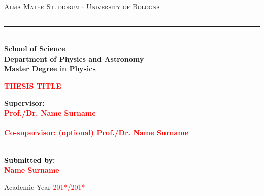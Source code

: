 \documentclass[12pt,a4paper]{report}
\begin{document}
\begin{titlepage}
%
%
%
%
\begin{center}
{{\Large{\textsc{Alma Mater Studiorum $\cdot$ University of  Bologna}}}} 
\rule[0.1cm]{15.8cm}{0.1mm}
\rule[0.5cm]{15.8cm}{0.6mm}
\\\vspace{3mm}
{\small{\bf School of Science \\
Department of Physics and Astronomy\\
Master Degree in Physics}}
\end{center}

\vspace{23mm}

\begin{center}\textcolor{red}{
%
%
{\LARGE{\bf THESIS TITLE}}\\
}\end{center}

\vspace{50mm} \par \noindent

\begin{minipage}[t]{0.47\textwidth}
%
%
{\large{\bf Supervisor: \vspace{2mm}\\\textcolor{red}{
Prof./Dr. Name Surname}\\\\
%
%
%
\textcolor{red}{
\bf Co-supervisor: (optional)
\vspace{2mm}
Prof./Dr. Name Surname\\\\}}}
\end{minipage}
%
\hfill
%
\begin{minipage}[t]{0.47\textwidth}\raggedleft \textcolor{black}{
{\large{\bf Submitted by:
\vspace{2mm}\\
%
%
\textcolor{red}{
Name Surname}}}
}
\end{minipage}

\vspace{40mm}

\begin{center}
%
%
Academic Year \textcolor{red}{ 201*/201*}
\end{center}

\end{titlepage}
\end{document}
